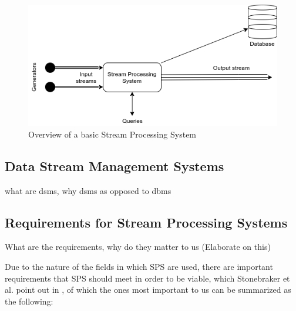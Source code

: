         \begin{figure}[h]
        \centering
        \includegraphics[width=1.0\textwidth]{Bilder/stream-processing-system.png}
        \caption{
                Overview of a basic Stream Processing System
                }
        \label{fig:stream-processing-system}
        \end{figure}
        \subsection{Data Stream Management Systems}
        what are dsms, why dsms as opposed to dbms

        \subsection{Requirements for Stream Processing Systems}
        What are the requirements, why do they matter to us (Elaborate on this)

        Due to the nature of the fields in which SPS are used, there are important requirements that SPS should meet in order to be viable, 
        which Stonebraker et al. point out in \cite{Stonebraker:2005:RRS:1107499.1107504}, of which the ones most important to us can be summarized as the following:
        
